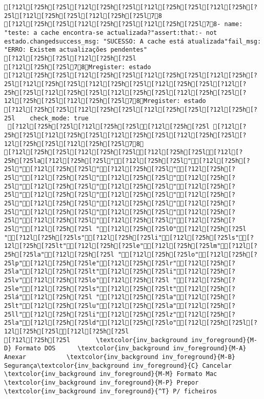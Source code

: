 \documentclass{scrartcl}
\begin{document}
\begin{Verbatim}
[?12l[?25h[?25l[?12l[?25h[?25l[?12l[?25h[?25l[?12l[?25h[?25l[?12l[?25h[?25l[?12l[?25h[?25l78
[?12l[?25h[?25l[?12l[?25h[?25l[?12l[?25h[?25l78- name: "teste: a cache encontra-se actualizada?"assert:that:- not estado.changedsuccess_msg: "SUCESSO: A cache está atualizada"fail_msg: "ERRO: Existem actualizações pendentes"
[?12l[?25h[?25l[?12l[?25h[?25l
[?12l[?25h[?25l78Mregister: estado
[?12l[?25h[?25l[?12l[?25h[?25l[?12l[?25h[?25l[?12l[?25h[?25l[?12l[?25h[?25l[?12l[?25h[?25l[?12l[?25h[?25l[?12l[?25h[?25l[?12l[?25h[?25l[?12l[?25h[?25l[?12l[?25h[?25l[?12l[?25h[?25l[?12l[?25h[?25l78Mregister: estado
[?12l[?25h[?25l[?12l[?25h[?25l[?12l[?25h[?25l[?12l[?25h[?25l    check_mode: true
 [?12l[?25h[?25l[?12l[?25h[?25l[?12l[?25h[?25l [?12l[?25h[?25l[?12l[?25h[?25l[?12l[?25h[?25l[?12l[?25h[?25l[?12l[?25h[?25l[?12l[?25h[?25l78
[?12l[?25h[?25l[?12l[?25h[?25l[?12l[?25h[?25l[?12l[?25h[?25la[?12l[?25h[?25l"[?12l[?25h[?25l"[?12l[?25h[?25l"[?12l[?25h[?25l"[?12l[?25h[?25l"[?12l[?25h[?25l"[?12l[?25h[?25l"[?12l[?25h[?25l"[?12l[?25h[?25l"[?12l[?25h[?25l"[?12l[?25h[?25l"[?12l[?25h[?25l"[?12l[?25h[?25l"[?12l[?25h[?25l"[?12l[?25h[?25l"[?12l[?25h[?25l"[?12l[?25h[?25l"[?12l[?25h[?25l"[?12l[?25h[?25l"[?12l[?25h[?25l"[?12l[?25h[?25l"[?12l[?25h[?25l"[?12l[?25h[?25l"[?12l[?25h[?25l"[?12l[?25h[?25l "[?12l[?25h[?25lO"[?12l[?25h[?25l "[?12l[?25h[?25ls"[?12l[?25h[?25li"[?12l[?25h[?25ls"[?12l[?25h[?25lt"[?12l[?25h[?25le"[?12l[?25h[?25lm"[?12l[?25h[?25la"[?12l[?25h[?25l "[?12l[?25h[?25lo"[?12l[?25h[?25lp"[?12l[?25h[?25le"[?12l[?25h[?25lr"[?12l[?25h[?25la"[?12l[?25h[?25lt"[?12l[?25h[?25li"[?12l[?25h[?25lv"[?12l[?25h[?25lo"[?12l[?25h[?25l "[?12l[?25h[?25le"[?12l[?25h[?25ls"[?12l[?25h[?25lt"[?12l[?25h[?25lá"[?12l[?25h[?25l "[?12l[?25h[?25la"[?12l[?25h[?25lt"[?12l[?25h[?25lu"[?12l[?25h[?25la"[?12l[?25h[?25ll"[?12l[?25h[?25li"[?12l[?25h[?25lz"[?12l[?25h[?25la"[?12l[?25h[?25ld"[?12l[?25h[?25lo"[?12l[?25h[?25l[?12l[?25h[?25l[?12l[?25h[?25l
[?12l[?25h[?25l       \textcolor{inv_background inv_foreground}{M-D} Formato DOS      \textcolor{inv_background inv_foreground}{M-A} Anexar           \textcolor{inv_background inv_foreground}{M-B} Segurança\textcolor{inv_background inv_foreground}{C} Cancelar          \textcolor{inv_background inv_foreground}{M-M} Formato Mac      \textcolor{inv_background inv_foreground}{M-P} Prepor           \textcolor{inv_background inv_foreground}{^T} P/ ficheiros

\end{Verbatim}
\end{document}
